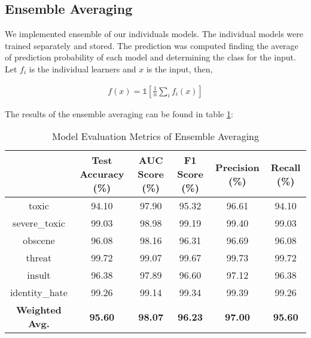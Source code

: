 \subsection{Ensemble Averaging}

We implemented ensemble of our individuals models. The individual models were trained separately and stored. The prediction was computed finding the average of prediction probability of each model and determining the class for the input. Let $f_i$ is the individual learners and $x$ is the input, then,

\begin{gather}
    f(x) = \mathds{1}[\frac{1}{n} \sum_i f_i(x)]
\end{gather}

The results of the ensemble averaging can be found in table \ref{tab:model_metrics_ensemble}:

\begin{table}[h]
\centering
\begin{tabular}{|c|c|c|c|c|c|}
\hline
 & Test Accuracy (\%) & AUC Score (\%) & F1 Score (\%) & Precision (\%) & Recall (\%) \\
\hline
toxic & 94.10 & 97.90 & 95.32 & 96.61 & 94.10 \\
severe\_toxic & 99.03 & 98.98 & 99.19 & 99.40 & 99.03 \\
obscene & 96.08 & 98.16 & 96.31 & 96.69 & 96.08 \\
threat & 99.72 & 99.07 & 99.67 & 99.73 & 99.72 \\
insult & 96.38 & 97.89 & 96.60 & 97.12 & 96.38 \\
identity\_hate & 99.26 & 99.14 & 99.34 & 99.39 & 99.26 \\
\hline
\textbf{Weighted Avg.} & \textbf{95.60} & \textbf{98.07} & \textbf{96.23} & \textbf{97.00} & \textbf{95.60} \\
\hline
\end{tabular}
\caption{Model Evaluation Metrics of Ensemble Averaging }
\label{tab:model_metrics_ensemble}
\end{table}

